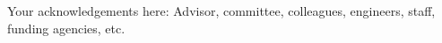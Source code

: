 \noindent
Your acknowledgements here: Advisor, committee, colleagues, engineers, staff, funding agencies, etc.

